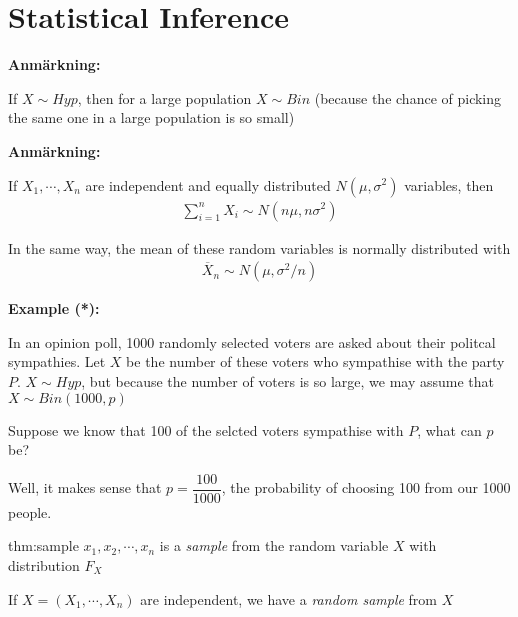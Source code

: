 \section{Statistical Inference}\par
\noindent\textbf{Anmärkning:}\par
\noindent If $X\sim Hyp$, then for a large population $X\sim Bin$ (because the chance of picking the same one in a large population is so small)
\par\bigskip
\noindent\textbf{Anmärkning:}\par
\noindent If $X_1,\cdots,X_n$ are independent and equally distributed $N(\mu,\sigma^2)$ variables, then
\begin{equation*}
  \begin{gathered}
    \sum_{i=1}^{n}X_i\sim N(n\mu,n\sigma^2)
  \end{gathered}
\end{equation*}\par
\noindent In the same way, the mean of these random variables is normally distributed with
\begin{equation*}
  \begin{gathered}
    \overline{X}_n \sim N(\mu,\sigma^2/n)
  \end{gathered}
\end{equation*}
\par\bigskip
\noindent\textbf{Example (*):}\par
\noindent In an opinion poll, 1000 randomly selected voters are asked about their politcal sympathies. Let $X$ be the number of these voters who sympathise with the party $P$. $X\sim Hyp$, but because the number of voters is so large, we may assume that $X\sim Bin(1000,p)$\par 
\noindent Suppose we know that 100 of the selcted voters sympathise with $P$, what can $p$ be?\par
\noindent Well, it makes sense that $p= \dfrac{100}{1000}$, the probability of choosing 100 from our 1000 people. 
\par\bigskip
\par\bigskip
\begin{theo}{thm:sample}
  $x_1,x_2,\cdots,x_n$ is a \textit{sample} from the random variable $X$ with distribution $F_X$
  \par\bigskip
  \noindent If $X = (X_1,\cdots,X_n)$ are independent, we have a \textit{random sample} from $X$
\end{theo}
